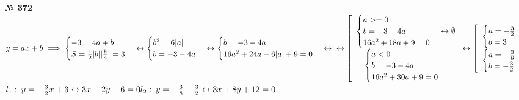 \documentclass[12pt]{article}
\DeclarePairedDelimiter\abs{\lvert}{\rvert}%
\newenvironment{task}[1][0]{\vspace{.5cm} {\textbf{№ #1} \vspace{.5cm}\\ }}{}
\begin{document}
\begin{task}[372]
$y=ax+b \implies
\begin{cases}
	-3=4a+b\\
	S=\frac{1}{2} \abs{b} \abs{\frac{b}{a}}=3
\end{cases} \leftrightarrow 
\begin{cases}
	b^2=6\abs{a}\\
	b = -3-4a
\end{cases} \leftrightarrow
\begin{cases}
	b=-3-4a\\
	16a^2+24a-6\abs{a}+9=0\\
\end{cases}\leftrightarrow\\ \leftrightarrow
\left[
\begin{array}{c}
	\begin{cases}
		a>=0\\
		b=-3-4a\\
		16a^2+18a+9=0\\
	\end{cases} \leftrightarrow \emptyset\\
	\begin{cases}
		a<0\\
		b=-3-4a\\
		16a^2+30a+9=0\\
	\end{cases}
\end{array}
\right. \leftrightarrow
\left[
\begin{array}{l}
	\begin{cases}
		a=-\frac{3}{2}\\
		b=3\\
	\end{cases}\\
	\begin{cases}
		a=-\frac{3}{8}\\
		b=-\frac{3}{2}
	\end{cases}
\end{array}
\right.
$\\
$l_1: \: y=-\frac{3}{2}x+3 \leftrightarrow 3x+2y-6=0\\
l_2: \: y=-\frac{3}{8}-\frac{3}{2} \leftrightarrow 3x+8y+12=0$\\
\end{task}
\end{document}

